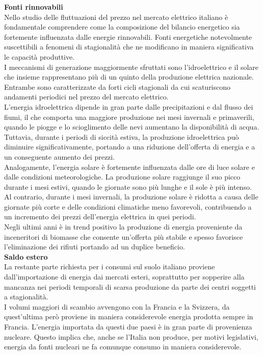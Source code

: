 \documentclass{article}
\begin{document}
\textbf{Fonti rinnovabili}\\
Nello studio delle fluttuazioni del prezzo nel mercato elettrico italiano è fondamentale comprendere come la composizione del bilancio energetico sia fortemente influenzata dalle energie rinnovabili. Fonti energetiche notevolmente suscettibili a fenomeni di stagionalità che ne modificano in maniera significativa le capacità produttive.\cite{EvaluationCostRisk2023}\\
I meccanismi di generazione maggiormente sfruttati sono l’idroelettrico e il solare che insieme rappresentano più di un quinto della produzione elettrica nazionale. Entrambe sono caratterizzate da forti cicli stagionali da cui scaturiscono andamenti periodici nel prezzo del mercato elettrico.\\
L'energia idroelettrica dipende in gran parte dalle precipitazioni e dal flusso dei fiumi, il che comporta una maggiore produzione nei mesi invernali e primaverili, quando le piogge e lo scioglimento delle nevi aumentano la disponibilità di acqua. Tuttavia, durante i periodi di siccità estiva, la produzione idroelettrica può diminuire significativamente, portando a una riduzione dell'offerta di energia e a un conseguente aumento dei prezzi.\\
Analogamente, l'energia solare è fortemente influenzata dalle ore di luce solare e dalle condizioni meteorologiche. La produzione solare raggiunge il suo picco durante i mesi estivi, quando le giornate sono più lunghe e il sole è più intenso. Al contrario, durante i mesi invernali, la produzione solare è ridotta a causa delle giornate più corte e delle condizioni climatiche meno favorevoli, contribuendo a un incremento dei prezzi dell'energia elettrica in quei periodi.\\
Negli ultimi anni è in trend positivo la produzione di energia proveniente da inceneritori di biomasse che consente un’offerta più stabile e spesso favorisce l’eliminazione dei rifiuti portando ad un duplice beneficio.\\
\textbf{Saldo estero}\\
La restante parte richiesta per i consumi sul suolo italiano proviene dall’importazione di energia dai mercati esteri, soprattutto per sopperire alla mancanza nei periodi temporali di scarsa produzione da parte dei centri soggetti a stagionalità.\\
I volumi maggiori di scambio avvengono con la Francia e la Svizzera, da quest’ultima però proviene in maniera considerevole energia prodotta sempre in Francia. L’energia importata da questi due paesi è in gran parte di provenienza nucleare. Questo implica che, anche se l’Italia non produce, per motivi legislativi, energia da fonti nucleari ne fa comunque consumo in maniera considerevole.\\
\end{document}
